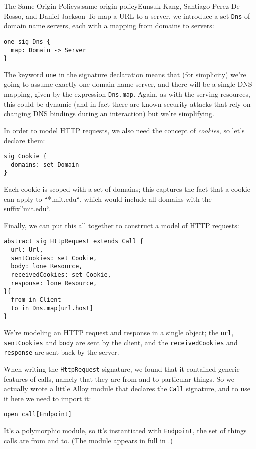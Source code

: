 \begin{aosachapter}{The Same-Origin Policy}{s:same-origin-policy}{Eunsuk Kang, Santiago Perez De Rosso, and Daniel Jackson}
To map a URL to a server, we introduce a set \texttt{Dns} of domain name
servers, each with a mapping from domains to servers:

\begin{verbatim}
one sig Dns {
  map: Domain -> Server
}
\end{verbatim}

The keyword \texttt{one} in the signature declaration means that (for
simplicity) we're going to assume exactly one domain name server, and
there will be a single DNS mapping, given by the expression
\texttt{Dns.map}. Again, as with the serving resources, this could be
dynamic (and in fact there are known security attacks that rely on
changing DNS bindings during an interaction) but we're simplifying.

In order to model HTTP requests, we also need the concept of
\emph{cookies}, so let's declare them:

\begin{verbatim}
sig Cookie {
  domains: set Domain
}
\end{verbatim}

Each cookie is scoped with a set of domains; this captures the fact that
a cookie can apply to ``*.mit.edu``, which would include all domains
with the suffix''mit.edu``.

Finally, we can put this all together to construct a model of HTTP
requests:

\begin{verbatim}
abstract sig HttpRequest extends Call {
  url: Url,
  sentCookies: set Cookie,
  body: lone Resource,
  receivedCookies: set Cookie,
  response: lone Resource,
}{
  from in Client
  to in Dns.map[url.host]
}
\end{verbatim}

We're modeling an HTTP request and response in a single object; the
\texttt{url}, \texttt{sentCookies} and \texttt{body} are sent by the
client, and the \texttt{receivedCookies} and \texttt{response} are sent
back by the server.

When writing the \texttt{HttpRequest} signature, we found that it
contained generic features of calls, namely that they are from and to
particular things. So we actually wrote a little Alloy module that
declares the \texttt{Call} signature, and to use it here we need to
import it:

\begin{verbatim}
open call[Endpoint]
\end{verbatim}

It's a polymorphic module, so it's instantiated with \texttt{Endpoint},
the set of things calls are from and to. (The module appears in full in
.)


\end{aosachapter}

